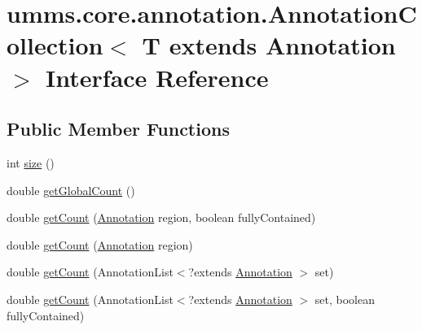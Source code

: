 \hypertarget{interfaceumms_1_1core_1_1annotation_1_1_annotation_collection_3_01_t_01extends_01_annotation_01_4}{\section{umms.\+core.\+annotation.\+Annotation\+Collection$<$ T extends Annotation $>$ Interface Reference}
\label{interfaceumms_1_1core_1_1annotation_1_1_annotation_collection_3_01_t_01extends_01_annotation_01_4}
}
\subsection*{Public Member Functions}
\begin{DoxyCompactItemize}
\item 
int \hyperlink{interfaceumms_1_1core_1_1annotation_1_1_annotation_collection_3_01_t_01extends_01_annotation_01_4_ab4d43fbfd436eb2c2016d5c8d1d55745}{size} ()
\item 
double \hyperlink{interfaceumms_1_1core_1_1annotation_1_1_annotation_collection_3_01_t_01extends_01_annotation_01_4_a78b46d17f831900001bc45e2643ae69e}{get\+Global\+Count} ()
\item 
double \hyperlink{interfaceumms_1_1core_1_1annotation_1_1_annotation_collection_3_01_t_01extends_01_annotation_01_4_a19932ce01d0745d0b2a391df45e06aa4}{get\+Count} (\hyperlink{interfaceumms_1_1core_1_1annotation_1_1_annotation}{Annotation} region, boolean fully\+Contained)
\item 
double \hyperlink{interfaceumms_1_1core_1_1annotation_1_1_annotation_collection_3_01_t_01extends_01_annotation_01_4_a78fa77c2ad0ba6371361cf3252e8d018}{get\+Count} (\hyperlink{interfaceumms_1_1core_1_1annotation_1_1_annotation}{Annotation} region)
\item 
double \hyperlink{interfaceumms_1_1core_1_1annotation_1_1_annotation_collection_3_01_t_01extends_01_annotation_01_4_a1b3046099adc161db98ba8bee1bfd186}{get\+Count} (Annotation\+List$<$?extends \hyperlink{interfaceumms_1_1core_1_1annotation_1_1_annotation}{Annotation} $>$ set)
\item 
double \hyperlink{interfaceumms_1_1core_1_1annotation_1_1_annotation_collection_3_01_t_01extends_01_annotation_01_4_a0cb852d96b704b02ace6fc68fe8e3229}{get\+Count} (Annotation\+List$<$?extends \hyperlink{interfaceumms_1_1core_1_1annotation_1_1_annotation}{Annotation} $>$ set, boolean fully\+Contained)

\end{DoxyCompactItemize}
